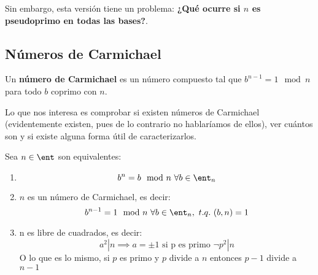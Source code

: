 Sin embargo, esta versión tiene un problema: \textbf{¿Qué ocurre si $n$ es pseudoprimo en todas las bases?}.

\subsection{Números de Carmichael}

\begin{defn}
Un \textbf{número de Carmichael} es un número compuesto tal que $b^{n-1}=1 \mod n$ para todo $b$ coprimo con $n$.
\end{defn}

Lo que nos interesa es comprobar si existen números de Carmichael (evidentemente existen, pues de lo contrario no hablaríamos de ellos), ver cuántos son y si existe alguna forma útil de caracterizarlos.

\begin{theorem}
Sea $n \in \ent$ son equivalentes:
\begin{enumerate}
\item \[b^n=b \mod n \ \forall b \in \ent_n\]
\item $n$ es un número de Carmichael, es decir:
\[b^{n-1} = 1 \mod n \ \forall b \in \ent_n, \ t.q. \ (b,n)=1 \]
\item n es libre de cuadrados, es decir:
\[a^2|n \implies a = \pm 1 \text{ si p es primo } \neg p^2 | n\]
O lo que es lo mismo, si $p$ es primo y $p$ divide a $n$ entonces $p-1$ divide a $n-1$
\end{enumerate}
\end{theorem}

